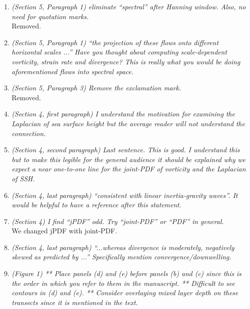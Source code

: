 \documentclass[11pt]{article}
\begin{document}
\begin{enumerate}
\item {\it (Section 5, Paragraph 1) eliminate ``spectral'' after Hanning window. Also, no need for
        quotation marks.}\\

        Removed.

\item {\it (Section 5, Paragraph 1) ``the projection of these flows onto different horizontal scales
            ...'' Have you thought about computing scale-dependent vorticity, strain rate and
            divergence? This is really what you would be doing
            aforementioned flows into spectral space.}

\item {\it (Section 5, Paragraph 3) Remove the exclamation mark.}\\

    Removed.

\item {\it (Section 4, first paragraph) I understand the motivation for examining the Laplacian of
      sea surface height but the average reader will not understand the connection.}

\item {\it (Section 4, second paragraph) Last sentence. This is good. I understand this but to
        make this legible for the general audience it should be explained why we expect a near
        one-to-one line for the joint-PDF of vorticity and the Laplacian of SSH.}

\item {\it (Section 4, last paragraph) ``consistent with linear inertia-gravity waves''.
        It would be
        helpful to have a reference after this statement.}

\item {\it (Section 4) I find “jPDF” odd. Try “joint-PDF” or “PDF” in general.}\\

We changed jPDF with joint-PDF.

\item {\it (Section 4, last paragraph) ``...whereas divergence is moderately, negatively skewed as
        predicted by ...'' Specifically mention convergence/downwelling.}

\item {\it (Figure 1) ** Place panels (d) and (e) before panels (b) and (c) since this is the order
        in which you refer to them in the manuscript. ** Difficult to see contours in (d) and
        (e). ** Consider overlaying mixed layer depth on these transects since it is mentioned
        in the text.}


\end{enumerate}
\end{document}
